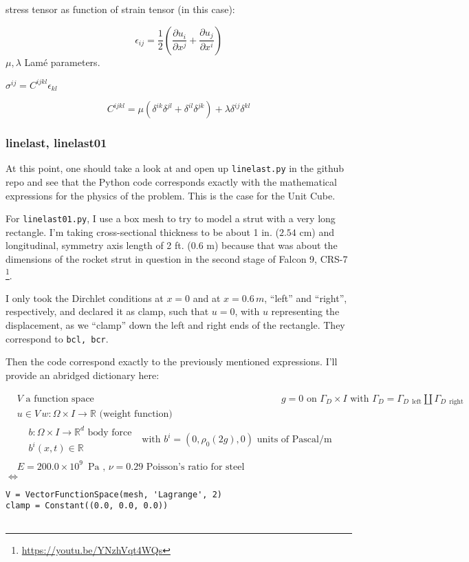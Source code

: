 \documentclass[twoside,landscape,10pt]{amsart}
\theoremstyle{plain}
\theoremstyle{definition}
\theoremstyle{remark}
\begin{document}
\begin{multicols*}{2}
stress tensor as function of strain tensor (in this case):

\[
\epsilon_{ij}  = \frac{1}{2} \left( \frac{ \partial u_i }{ \partial x^j} + \frac{ \partial u_j}{ \partial x^i} \right)
\]
$\mu,\lambda$ Lam\'e parameters.

$\sigma^{ij} = C^{ijkl}\epsilon_{kl}$

\[
C^{ijkl} = \mu ( \delta^{ik} \delta^{jl} + \delta^{il} \delta^{jk} ) + \lambda \delta^{ij} \delta^{kl}
\]

\subsubsection{linelast, linelast01}

At this point, one should take a look at and open up \verb|linelast.py| in the github repo and see that the Python code corresponds exactly with the mathematical expressions for the physics of the problem.  This is the case for the Unit Cube.  

For \verb|linelast01.py|, I use a box mesh to try to model a strut with a very long rectangle.  I'm taking cross-sectional thickness to be about 1 in. ($2.54$ cm) and longitudinal, symmetry axis length of 2 ft. ($0.6$ m) because that was about the dimensions of the rocket strut in question in the second stage of Falcon 9, CRS-7 \footnote{\url{https://youtu.be/YNzhVqt4WQs}}.  

I only took the Dirchlet conditions at $x=0$ and at $x=0.6 \, m$, ``left'' and ``right'', respectively, and declared it as clamp, such that $u =0$, with $u$ representing the displacement, as we ``clamp'' down the left and right ends of the rectangle.  They correspond to \verb|bcl, bcr|.  

Then the code correspond exactly to the previously mentioned expressions.  I'll provide an abridged dictionary here:

\[
\begin{aligned}
  & V \text{ a function space }
  & g = 0 \text{ on } \Gamma_D \times I \text{ with } \Gamma_D = \Gamma_{D \, \text{ left}} \coprod \Gamma_{D \, \text{ right} } \\
  & u \in V \, w :\Omega \times I \to \mathbb{R} \text{ (weight function) }\\
  & \begin{aligned} 
      & b : \Omega \times I \to \mathbb{R}^d \text{ body force } \\
      & b^i(x,t) \in \mathbb{R}
 \end{aligned} \text{ with } b^i = (0, \rho_0(2g), 0) \text{ units of Pascal/m}  \\
  & E  = 200.0\times 10^9 \, \text{ Pa }, \, \nu = 0.29 \text{ Poisson's ratio for steel }
\end{aligned}
\]
$\Longleftrightarrow$
\begin{lstlisting}
V = VectorFunctionSpace(mesh, 'Lagrange', 2)
clamp = Constant((0.0, 0.0, 0.0))


\end{lstlisting}
\end{multicols*}
\end{document}
